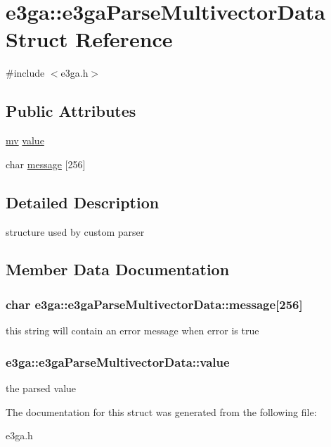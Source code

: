 \hypertarget{structe3ga_1_1e3ga_parse_multivector_data}{\section{e3ga\-:\-:e3ga\-Parse\-Multivector\-Data Struct Reference}
\label{structe3ga_1_1e3ga_parse_multivector_data}
}


{\ttfamily \#include $<$e3ga.\-h$>$}

\subsection*{Public Attributes}
\begin{DoxyCompactItemize}
\item 
\hyperlink{classe3ga_1_1mv}{mv} \hyperlink{structe3ga_1_1e3ga_parse_multivector_data_a0ef438f388f65cab630de46ef25457ef}{value}
\item 
char \hyperlink{structe3ga_1_1e3ga_parse_multivector_data_a1a10b69f504a493547125317c33026fd}{message} \mbox{[}256\mbox{]}
\end{DoxyCompactItemize}


\subsection{Detailed Description}
structure used by custom parser 

\subsection{Member Data Documentation}
\hypertarget{structe3ga_1_1e3ga_parse_multivector_data_a1a10b69f504a493547125317c33026fd}{
\subsubsection[{message}]{\setlength{\rightskip}{0pt plus 5cm}char e3ga\-::e3ga\-Parse\-Multivector\-Data\-::message\mbox{[}256\mbox{]}}}\label{structe3ga_1_1e3ga_parse_multivector_data_a1a10b69f504a493547125317c33026fd}
this string will contain an error message when error is true \hypertarget{structe3ga_1_1e3ga_parse_multivector_data_a0ef438f388f65cab630de46ef25457ef}{
\subsubsection[{value}]{ e3ga\-::e3ga\-Parse\-Multivector\-Data\-::value}}\label{structe3ga_1_1e3ga_parse_multivector_data_a0ef438f388f65cab630de46ef25457ef}
the parsed value 

The documentation for this struct was generated from the following file\-:\begin{DoxyCompactItemize}
\item 
e3ga.\-h\end{DoxyCompactItemize}
